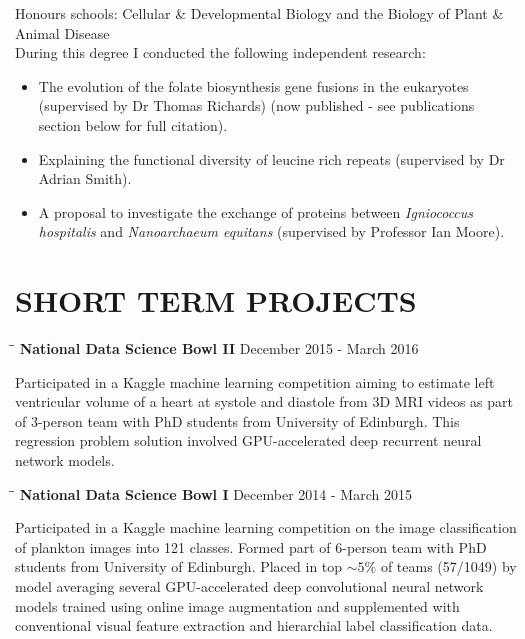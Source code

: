 \documentclass{res}
\begin{document}
\begin{resume}
\begin{tabbing}
   \end{tabbing}\vspace{-20pt}  
Honours schools: Cellular \& Developmental Biology and the Biology of Plant \& Animal Disease\\
During this degree I conducted the following independent research:
\begin{itemize}
        \vspace{-10pt}
    \item The evolution of the folate biosynthesis gene fusions in the eukaryotes (supervised by Dr Thomas Richards) (now published - see publications section below for full citation).
    \item Explaining the functional diversity of leucine rich repeats (supervised by Dr Adrian Smith).
    \item A proposal to investigate the exchange of proteins between  \emph{Igniococcus hospitalis} and  \emph{Nanoarchaeum equitans} (supervised by Professor Ian Moore).
\end{itemize}


\section{SHORT TERM PROJECTS}

   \vspace{-0.05in} 
   \begin{tabbing}
   \hspace{2in}\= \hspace{2.6in}\= \kill 
    {\bf National Data Science Bowl II} \> \>        December 2015 - March 2016\\
     \end{tabbing}\vspace{-20pt}      
     Participated in a Kaggle machine learning competition aiming to estimate left ventricular volume of a heart at systole and diastole from 3D MRI videos as 
     part of 3-person team with PhD students from University of Edinburgh. 
     This regression problem solution involved GPU-accelerated deep recurrent neural network models.

   \vspace{-0.15in} 
   \begin{tabbing}
   \hspace{2in}\= \hspace{2.6in}\= \kill 
   {\bf National Data Science Bowl I} \> \>        December 2014 - March 2015\\
     \end{tabbing}\vspace{-20pt}      
     Participated in a Kaggle machine learning competition on the image classification of plankton images into 121 classes. Formed part of 6-person team with PhD students from University of Edinburgh. 
     Placed in top $\sim5\%$ of teams (57/1049) by model averaging several GPU-accelerated deep convolutional neural network models trained using online image augmentation and supplemented with conventional visual feature extraction and hierarchial label classification data.
     

\end{resume}
\end{document}
